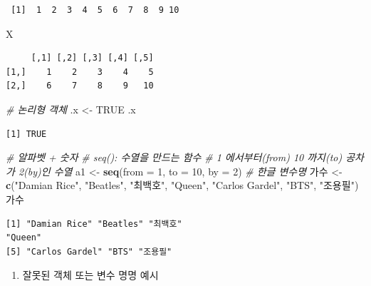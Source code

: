 \documentclass[
  11pt,
]{krantz}
\newenvironment{Shaded}{\begin{snugshade}}{\end{snugshade}}
\newcommand{\CommentTok}[1]{\textcolor[rgb]{0.37,0.37,0.37}{\textit{#1}}}
\newcommand{\DataTypeTok}[1]{\textcolor[rgb]{0.27,0.27,0.27}{#1}}
\newcommand{\DecValTok}[1]{\textcolor[rgb]{0.06,0.06,0.06}{#1}}
\newcommand{\KeywordTok}[1]{\textcolor[rgb]{0.27,0.27,0.27}{\textbf{#1}}}
\newcommand{\NormalTok}[1]{#1}
\newcommand{\OtherTok}[1]{\textcolor[rgb]{0.37,0.37,0.37}{#1}}
\newcommand{\StringTok}[1]{\textcolor[rgb]{0.5,0.5,0.5}{#1}}
\providecommand{\tightlist}{%
  \setlength{\itemsep}{0pt}\setlength{\parskip}{0pt}}
\begin{document}
\begin{verbatim}
 [1]  1  2  3  4  5  6  7  8  9 10
\end{verbatim}

\begin{Shaded}
\begin{Highlighting}[]
\NormalTok{X}
\end{Highlighting}
\end{Shaded}

\begin{verbatim}
     [,1] [,2] [,3] [,4] [,5]
[1,]    1    2    3    4    5
[2,]    6    7    8    9   10
\end{verbatim}

\begin{Shaded}
\begin{Highlighting}[]
\CommentTok{# 논리형 객체}
\NormalTok{.x <-}\StringTok{ }\OtherTok{TRUE}
\NormalTok{.x}
\end{Highlighting}
\end{Shaded}

\begin{verbatim}
[1] TRUE
\end{verbatim}

\begin{Shaded}
\begin{Highlighting}[]
\CommentTok{# 알파벳 + 숫자}
\CommentTok{# seq(): 수열을 만드는 함수}
\CommentTok{# 1 에서부터(from) 10 까지(to) 공차가 2(by)인 수열}
\NormalTok{a1 <-}\StringTok{ }\KeywordTok{seq}\NormalTok{(}\DataTypeTok{from =} \DecValTok{1}\NormalTok{, }\DataTypeTok{to =} \DecValTok{10}\NormalTok{, }\DataTypeTok{by =} \DecValTok{2}\NormalTok{)}
\CommentTok{# 한글 변수명}
\NormalTok{가수 <-}\StringTok{ }\KeywordTok{c}\NormalTok{(}\StringTok{"Damian Rice"}\NormalTok{, }\StringTok{"Beatles"}\NormalTok{, }\StringTok{"최백호"}\NormalTok{, }\StringTok{"Queen"}\NormalTok{, }\StringTok{"Carlos Gardel"}\NormalTok{, }\StringTok{"BTS"}\NormalTok{, }\StringTok{"조용필"}\NormalTok{)}
\NormalTok{가수}
\end{Highlighting}
\end{Shaded}

\begin{verbatim}
[1] "Damian Rice" "Beatles" "최백호"
"Queen"
[5] "Carlos Gardel" "BTS" "조용필"
\end{verbatim}

\normalsize

\begin{enumerate}
\def\labelenumi{\arabic{enumi}.}
\setcounter{enumi}{2}
\tightlist
\item
  잘못된 객체 또는 변수 명명 예시
\end{enumerate}
\end{document}
